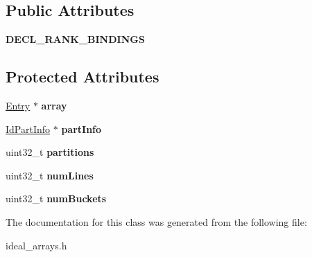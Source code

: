 \subsection*{Public Attributes}
\begin{DoxyCompactItemize}
\item 
\hypertarget{classIdealLRUPartReplPolicy_a2f7060fb9a38de21c7312d17bcd0eb0d}{{\bfseries D\-E\-C\-L\-\_\-\-R\-A\-N\-K\-\_\-\-B\-I\-N\-D\-I\-N\-G\-S}}\label{classIdealLRUPartReplPolicy_a2f7060fb9a38de21c7312d17bcd0eb0d}

\end{DoxyCompactItemize}
\subsection*{Protected Attributes}
\begin{DoxyCompactItemize}
\item 
\hypertarget{classIdealLRUPartReplPolicy_a029b993b311cd5d260fc831216105dd5}{\hyperlink{structIdealLRUPartReplPolicy_1_1Entry}{Entry} $\ast$ {\bfseries array}}\label{classIdealLRUPartReplPolicy_a029b993b311cd5d260fc831216105dd5}

\item 
\hypertarget{classIdealLRUPartReplPolicy_a496bfae1cdf483997395949426ca0799}{\hyperlink{structIdealLRUPartReplPolicy_1_1IdPartInfo}{Id\-Part\-Info} $\ast$ {\bfseries part\-Info}}\label{classIdealLRUPartReplPolicy_a496bfae1cdf483997395949426ca0799}

\item 
\hypertarget{classIdealLRUPartReplPolicy_a9dfaf286a21c022139a36ed10d94e3bf}{uint32\-\_\-t {\bfseries partitions}}\label{classIdealLRUPartReplPolicy_a9dfaf286a21c022139a36ed10d94e3bf}

\item 
\hypertarget{classIdealLRUPartReplPolicy_aacf66826621b4e88242f767bafc98705}{uint32\-\_\-t {\bfseries num\-Lines}}\label{classIdealLRUPartReplPolicy_aacf66826621b4e88242f767bafc98705}

\item 
\hypertarget{classIdealLRUPartReplPolicy_aaca59e41a732517b26e87259f0fa589b}{uint32\-\_\-t {\bfseries num\-Buckets}}\label{classIdealLRUPartReplPolicy_aaca59e41a732517b26e87259f0fa589b}

\end{DoxyCompactItemize}


The documentation for this class was generated from the following file\-:\begin{DoxyCompactItemize}
\item 
ideal\-\_\-arrays.\-h\end{DoxyCompactItemize}
